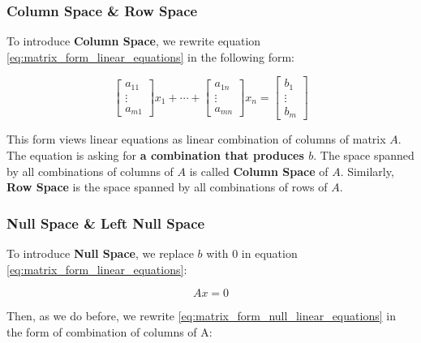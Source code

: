 \documentclass[a4paper]{book}
\begin{document}
      \subsubsection{Column Space \& Row Space}
      To introduce \textbf{Column Space}, we rewrite equation
      \ref{eq:matrix_form_linear_equations} in the following form:

      \begin{displaymath}
        \begin{bmatrix}
          a_{11} \\
          \vdots \\
          a_{m1}
        \end{bmatrix}
        x_{1} + \cdots + 
        \begin{bmatrix}
          a_{1n} \\
          \vdots \\
          a_{mn}
        \end{bmatrix}
        x_{n}
        = 
        \begin{bmatrix}
          b_{1} \\
          \vdots \\
          b_{m}
        \end{bmatrix}
      \end{displaymath}

      This form views linear equations as linear combination of columns
      of matrix $A$. The equation is asking for \textbf{a combination
        that produces $b$}. The space spanned by all combinations of
      columns of $A$ is called \textbf{Column Space} of $A$. Similarly,
      \textbf{Row Space} is the space spanned by all combinations of
      rows of $A$.

      \subsubsection{Null Space \& Left Null Space}
      To introduce \textbf{Null Space}, we replace $b$ with $0$ in equation
      \ref{eq:matrix_form_linear_equations}:

      \begin{equation}
        Ax = 0
        \label{eq:matrix_form_null_linear_equations}
      \end{equation}

      Then, as we do before, we rewrite
      \ref{eq:matrix_form_null_linear_equations} in the form of
      combination of columns of A:
\end{document}
